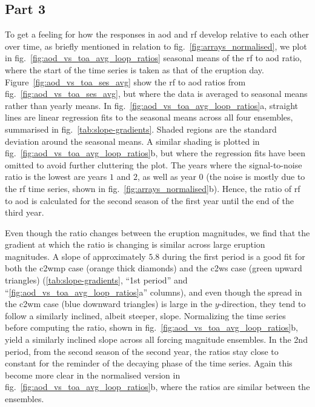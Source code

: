\documentclass{ametsocV6.1}
\begin{document}
\subsection{Part 3}

To get a feeling for how the responses in \gls{aod} and \gls{rf} develop relative to
each other over time, as briefly mentioned in relation to
fig.~\ref{fig:arrays_normalised}, we plot in fig.~\ref{fig:aod_vs_toa_avg_loop_ratios}
seasonal means of the \gls{rf} to \gls{aod} ratio, where the start of the time series is
taken as that of the eruption day. Figure~\ref{fig:aod_vs_toa_ses_avg} show the \gls{rf}
to \gls{aod} ratios from fig.~\ref{fig:aod_vs_toa_ses_avg}, but where the data is
averaged to seasonal means rather than yearly means. In
fig.~\ref{fig:aod_vs_toa_avg_loop_ratios}a, straight lines are linear regression fits to
the seasonal means across all four ensembles, summarised in
fig.~\ref{tab:slope-gradients}. Shaded regions are the standard deviation around the
seasonal means. A similar shading is plotted in
fig.~\ref{fig:aod_vs_toa_avg_loop_ratios}b, but where the regression fits have been
omitted to avoid further cluttering the plot. The years where the signal-to-noise ratio
is the lowest are years \(1\) and \(2\), as well as year \(0\) (the noise is mostly due
to the \gls{rf} time series, shown in fig.~\ref{fig:arrays_normalised}b). Hence, the
ratio of \gls{rf} to \gls{aod} is calculated for the second season of the first year
until the end of the third year.

Even though the ratio changes between the eruption magnitudes, we find that the gradient
at which the ratio is changing is similar across large eruption magnitudes. A slope of
approximately \(5.8\) during the first period is a good fit for both the \gls{c2wmp}
case (orange thick diamonds) and the \gls{c2ws} case (green upward triangles)
(\ref{tab:slope-gradients}, ``1st period'' and ``\ref{fig:aod_vs_toa_avg_loop_ratios}a''
columns), and even though the spread in the \gls{c2wm} case (blue downward triangles) is
large in the \(y\)-direction, they tend to follow a similarly inclined, albeit steeper,
slope. Normalizing the time series before computing the ratio, shown in
fig.~\ref{fig:aod_vs_toa_avg_loop_ratios}b, yield a similarly inclined slope across all
forcing magnitude ensembles. In the 2nd period, from the second season of the second
year, the ratios stay close to constant for the reminder of the decaying phase of the
time series. Again this become more clear in the normalised version in
fig.~\ref{fig:aod_vs_toa_avg_loop_ratios}b, where the ratios are similar between the
ensembles.
\end{document}
